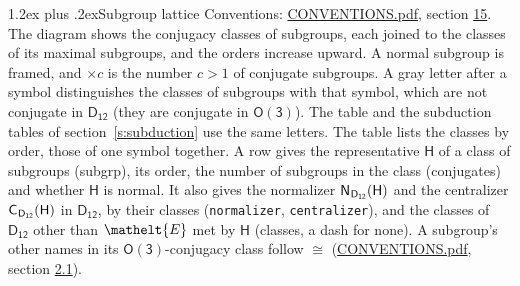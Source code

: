 \documentclass[10pt,a4paper]{article}
\makeatletter
\renewcommand\section{\@startsection{section}{1}{\z@}{-3ex plus -1ex minus -.2ex}%
  {1.2ex plus .2ex}{\normalfont\large\sffamily\bfseries\color{parttitle}}}
\numberwithin{equation}{section}
\newcommand{\eltfont}[1]{{\let\sigma\eltsigma\mathelt{#1}}}
\newcommand{\grp}[1]{\mathsf{#1}}
\newcommand{\cls}[1]{\eltfont{#1}}
\newcommand{\samecls}{\cong}
\newcommand{\hairsp}{\mkern1mu}
\makeatother
\begin{document}
\section{Subgroup lattice}\label{s:subgroups}
Conventions: \href{../../CONVENTIONS.pdf}{CONVENTIONS.pdf}, section \href{../../CONVENTIONS.pdf\#conv.15}{15}.
The diagram shows the conjugacy classes of subgroups, each joined to the classes of its maximal subgroups, and the orders increase upward. A normal subgroup is framed, and ${\times}c$ is the number $c > 1$ of conjugate subgroups. A gray letter after a symbol distinguishes the classes of subgroups with that symbol, which are not conjugate in $\grp{D_{12}}$ (they are conjugate in \href{O3.pdf}{$\grp{O(3)}$}). The table and the subduction tables of section~\ref{s:subduction} use the same letters. The table lists the classes by order, those of one symbol together. \label{n:group.H}\label{n:head.subgroup}\label{n:head.order}\label{n:head.conjugates}\label{n:head.normal}A row gives the representative $\grp{H}$ of a class of subgroups (subgrp), its order, the number of subgroups in the class (conjugates) and whether $\grp{H}$ is normal. \label{n:group.normalizer}\label{n:group.centralizer}\label{n:head.classes}It also gives the normalizer $\grp{N}_{\hairsp \grp{D_{12}}}(\grp{H})$ and the centralizer $\grp{C}_{\hairsp \grp{D_{12}}}(\grp{H})$ in $\grp{D_{12}}$, by their classes (\texttt{normalizer}, \texttt{centralizer}), and the classes of $\grp{D_{12}}$ other than $\cls{E}$ met by $\grp{H}$ (classes, a dash for none). A subgroup's other names in its \href{O3.pdf}{$\grp{O(3)}$}-conjugacy class follow $\samecls$ (\href{../../CONVENTIONS.pdf}{CONVENTIONS.pdf}, section \href{../../CONVENTIONS.pdf\#conv.2.1}{2.1}).
\end{document}
